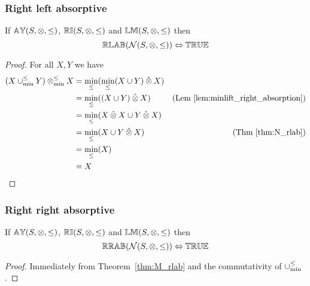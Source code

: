 \documentclass[../Summary.tex]{subfiles}
\begin{document}
\subsubsection{Right left absorptive}

\begin{theorem} \label{thm:M_rlab}
If ${\mathbb{AY}}(S,\otimes,\leq)$, ${\mathbb{RI}}(S,\otimes,\leq)$ and ${\mathbb{LM}}(S,\otimes,\leq)$ then
\begin{equation*}
{\mathbb{RLAB}}(\mathcal{N}(S,\otimes,\leq)) \Leftrightarrow {\mathbb{TRUE}}
\end{equation*}
\end{theorem}


\begin{proof}

\vspace{0.5em}
For all $X, Y$ we have
\begin{align*}
(X \mathbin{\cup_{\min}^{\leq}} Y) \mathbin{\otimes_{\min}^{\leq}} X 	& = \min_\leq(\min_\leq(X \cup Y) \mathbin{\hat{\otimes}} X) \\
							& = \min_\leq((X \cup Y) \mathbin{\hat{\otimes}} X) & \text{(Lem \ref{lem:minlift_right_absorption})} \\
							& = \min_\leq(X \mathbin{\hat{\otimes}} X \cup Y \mathbin{\hat{\otimes}} X) \\
							& = \min_\leq(X \cup Y \mathbin{\hat{\otimes}} X) & \text{(Thm \ref{thm:N_rlab})} \\
							& = \min_\leq(X) \\
							& = X
\end{align*}
\end{proof}




\subsubsection{Right right absorptive}

\begin{theorem} \label{thm:M_rrab}
If ${\mathbb{AY}}(S,\otimes,\leq)$, ${\mathbb{RI}}(S,\otimes,\leq)$ and ${\mathbb{LM}}(S,\otimes,\leq)$ then
\begin{equation*}
{\mathbb{RRAB}}(\mathcal{N}(S,\otimes,\leq)) \Leftrightarrow {\mathbb{TRUE}}
\end{equation*}
\end{theorem}


\begin{proof}

\vspace{0.5em}
Immediately from Theorem~\ref{thm:M_rlab} and the commutativity of $\mathbin{\cup_{\min}^{\leq}}$.
\end{proof}
\end{document}
